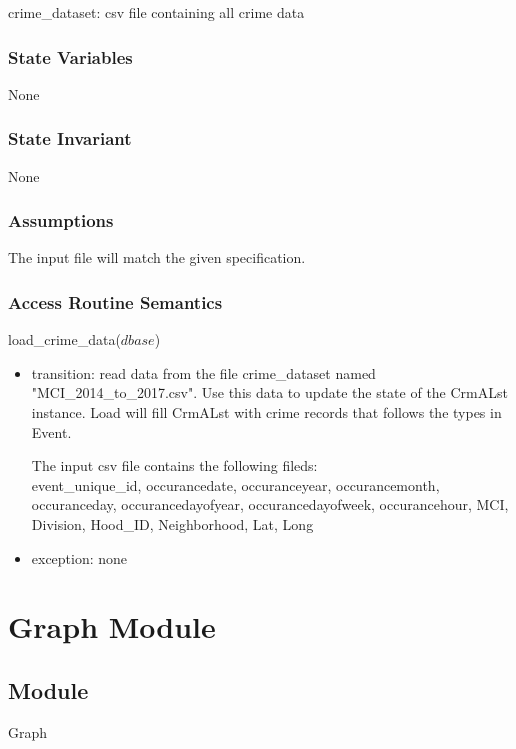 \documentclass[12pt]{article}
\begin{document}
crime\_dataset: csv file containing all crime data

\subsubsection* {State Variables}

None

\subsubsection* {State Invariant}

None

\subsubsection* {Assumptions}

The input file will match the given specification.

\subsubsection* {Access Routine Semantics}

\noindent load\_crime\_data($dbase$)
\begin{itemize}
\item transition: read data from the file crime\_dataset named "MCI\_2014\_to\_2017.csv".
  Use this data to update the state of the CrmALst instance.  Load will fill CrmALst with crime records that
  follows the types in Event.

  The input csv file contains the following fileds:\\
  event\_unique\_id, occurancedate, occuranceyear, occurancemonth, occuranceday, occurancedayofyear, occurancedayofweek, occurancehour, MCI, Division, Hood\_ID, Neighborhood, Lat, Long
  
 
\item exception: none
\end{itemize}


\newpage
\section* {Graph Module}

\subsection*{Module}

Graph
\end{document}
